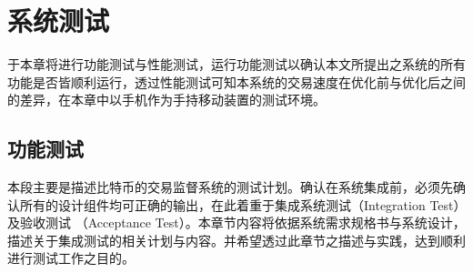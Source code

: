 \chapter{系统测试}
于本章将进行功能测试与性能测试，运行功能测试以确认本文所提出之系统的所有功能是否皆顺利运行，透过性能测试可知本系统的交易速度在优化前与优化后之间的差异，在本章中以手机作为手持移动装置的测试环境。
	\section{功能测试}
	 	本段主要是描述比特币的交易监督系统的测试计划。确认在系统集成前，必须先确认所有的设计组件均可正确的输出，在此着重于集成系统测试（Integration Test）及验收测试 （Acceptance Test）。本章节内容将依据系统需求规格书与系统设计，描述关于集成测试的相关计划与内容。并希望透过此章节之描述与实践，达到顺利进行测试工作之目的。
